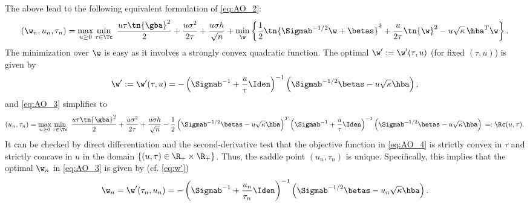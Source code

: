 The above lead to the following equivalent formulation of \eqref{eq:AO_2}:
\begin{align}
\left(\w_n,u_n,\tau_n\right) = \max_{u\geq 0}\min_{\tau\in\Tc} ~ \frac{u\tau\tn{\gba}^2}{2} + \frac{u\sigma^2}{2\tau} + \frac{u\sigma h}{\sqrt{n}} + \min_{\w} \left\{ \frac{1}{2}\tn{\Sigmab^{-1/2}\w+\betas}^2 + \frac{u}{2\tau}\tn{\w}^2 - u \sqrt{\kappa}\,{\hba}^T\w \right\} .\label{eq:AO_3}
\end{align}
The minimization over $\w$ is easy as it involves a strongly convex quadratic function. The optimal $\w':=\w'(\tau,u)$ (for fixed $(\tau,u)$) is given by
\begin{align}\label{eq:w'}
\w':=\w'(\tau,u) = -\left(\Sigmab^{-1}+\frac{u}{\tau}\Iden\right)^{-1}\left(\Sigmab^{-1/2}\betas-u\sqrt{\kappa}\hba\right), 
\end{align}
and \eqref{eq:AO_3} simplifies to
\begin{align}
\left(u_n,\tau_n\right)=\max_{u\geq 0}\min_{\tau\in\Tc} ~ \frac{u\tau\tn{\gba}^2}{2} + \frac{u\sigma^2}{2\tau} + \frac{u\sigma h}{\sqrt{n}} - \frac{1}{2} \left(\Sigmab^{-1/2}\betas-u\sqrt{\kappa}\hba\right)^T\left(\Sigmab^{-1}+\frac{u}{\tau}\Iden\right)^{-1} \left(\Sigmab^{-1/2}\betas-u\sqrt{\kappa}\hba\right)\,=:\Rc(u,\tau) .\label{eq:AO_4}
\end{align}
It can be checked by direct differentiation and the second-derivative test that the objective function in \eqref{eq:AO_4} is strictly convex in $\tau$ and strictly concave in $u$ in the domain $\{(u,\tau)\in\R_+\times\R_+\}$. Thus, the saddle point $(u_n,\tau_n)$ is unique. Specifically, this implies that the optimal $\w_n$ in \eqref{eq:AO_3} is given by (cf. \eqref{eq:w'})
\begin{align}\label{eq:w_n}
\w_n=\w'(\tau_n,u_n) = -\left(\Sigmab^{-1}+\frac{u_n}{\tau_n}\Iden\right)^{-1}\left(\Sigmab^{-1/2}\betas-u_n\sqrt{\kappa}\hba\right).
\end{align}

